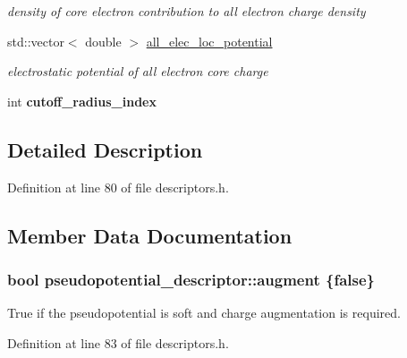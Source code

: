 \begin{DoxyCompactItemize}
\begin{DoxyCompactList}\small\item\em density of core electron contribution to all electron charge density \end{DoxyCompactList}\item 
std\+::vector$<$ double $>$ \hyperlink{structpseudopotential__descriptor_a7dc4249e8f3d2c4a6a4c518edc3ca7f5}{all\+\_\+elec\+\_\+loc\+\_\+potential}
\begin{DoxyCompactList}\small\item\em electrostatic potential of all electron core charge \end{DoxyCompactList}\item 
\hypertarget{structpseudopotential__descriptor_a839d8de924a5ce7caae537b9734dcbf7}{}int {\bfseries cutoff\+\_\+radius\+\_\+index}\label{structpseudopotential__descriptor_a839d8de924a5ce7caae537b9734dcbf7}

\end{DoxyCompactItemize}


\subsection{Detailed Description}


Definition at line 80 of file descriptors.\+h.



\subsection{Member Data Documentation}
\hypertarget{structpseudopotential__descriptor_a924706ceb283fbae59e46fb0ff947054}{}
\subsubsection[{augment}]{\setlength{\rightskip}{0pt plus 5cm}bool pseudopotential\+\_\+descriptor\+::augment \{false\}}\label{structpseudopotential__descriptor_a924706ceb283fbae59e46fb0ff947054}


True if the pseudopotential is soft and charge augmentation is required. 



Definition at line 83 of file descriptors.\+h.

\hypertarget{structpseudopotential__descriptor_a4f218335e6684e55cffb46f33d6ff472}{}
